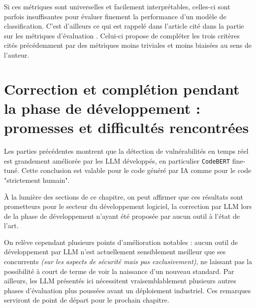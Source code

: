             Si ces métriques sont universelles et facilement interprétables, celles-ci sont
            parfois insuffisantes pour évaluer finement la performance d'un modèle de
            classification. C'est d'ailleurs ce qui est rappelé dans l'article cité dans la partie
            sur les métriques d'évaluation \cite{40article}. Celui-ci propose de compléter les
            trois critères cités précédemment par des métriques moins triviales et moins
            biaisées au sens de l'auteur.

    \section{Correction et complétion pendant la phase de développement : promesses et difficultés rencontrées}
        Les parties précédentes montrent que la détection de vulnérabilités en temps réel est
        grandement améliorée par les LLM développés, en particulier \texttt{CodeBERT} fine-tuné.
        Cette conclusion est valable pour le code généré par IA comme pour le code "strictement
        humain".

        À la lumière des sections de ce chapitre, on peut affirmer que ces résultats sont
        prometteurs pour le secteur du développement logiciel, la correction par LLM lors de la
        phase de développement n'ayant été proposée par aucun outil à l'état de l'art.

        On relève cependant plusieurs points d'amélioration notables : aucun outil de
        développement par LLM n'est actuellement sensiblement meilleur que ses concurrents \textit{(sur les aspects de sécurité mais pas exclusivement)}, ne
        laissant pas la possibilité à court de terme de voir la naissance d'un nouveau standard.
        Par ailleurs, les LLM présentés ici nécessitent vraisemblablement plusieurs autres
        phases d'évaluation plus poussées avant un déploiement industriel. Ces remarques
        serviront de point de départ pour le prochain chapitre.